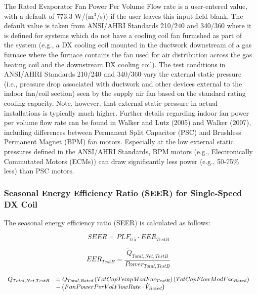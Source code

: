 The Rated Evaporator Fan Power Per Volume Flow rate is a user-entered value, with a default of 773.3 W/(m\(^{3}\)/s)) if the user leaves this input field blank. The default value is taken from ANSI/AHRI Standards 210/240 and 340/360 where it is defined for systems which do not have a cooling coil fan furnished as part of the system (e.g., a DX cooling coil mounted in the ductwork downstream of a gas furnace where the furnace contains the fan used for air distribution across the gas heating coil and the downstream DX cooling coil). The test conditions in ANSI/AHRI Standards 210/240 and 340/360 vary the external static pressure (i.e., pressure drop associated with ductwork and other devices external to the indoor fan/coil section) seen by the supply air fan based on the standard rating cooling capacity. Note, however, that external static pressure in actual installations is typically much higher. Further details regarding indoor fan power per volume flow rate can be found in Walker and Lutz (2005) and Walker (2007), including differences between Permanent Split Capacitor (PSC) and Brushless Permanent Magnet (BPM) fan motors. Especially at the low external static pressures defined in the ANSI/AHRI Standards, BPM motors (e.g., Electronically Commutated Motors (ECMs)) can draw significantly less power (e.g., 50-75\% less) than PSC motors.

\subsubsection{Seasonal Energy Efficiency Ratio (SEER) for Single-Speed DX Coil}\label{seasonal-energy-efficiency-ratio-seer-for-single-speed-dx-coil}

The seasonal energy efficiency ratio (SEER) is calculated as follows:

\begin{equation}
SEER = PL{F_{0.5}} \cdot EE{R_{TestB}}
\end{equation}

\begin{equation}
EE{R_{TestB}} = \frac{{{{\dot Q}_{Total,Net,TestB}}}}{{Powe{r_{Total,TestB}}}}
\end{equation}

\begin{equation}
  \begin{array}{rl}
    \dot{Q}_{Total,Net,TestB} &= \dot{Q}_{Total,Rated} \left(TotCapTempModFac_{TestB}\right)\left(TotCapFlowModFac_{Rated}\right) \\
                              &- \left(FanPowerPerVolFlowRate \cdot \dot{V}_{Rated}\right)
  \end{array}
\end{equation}

